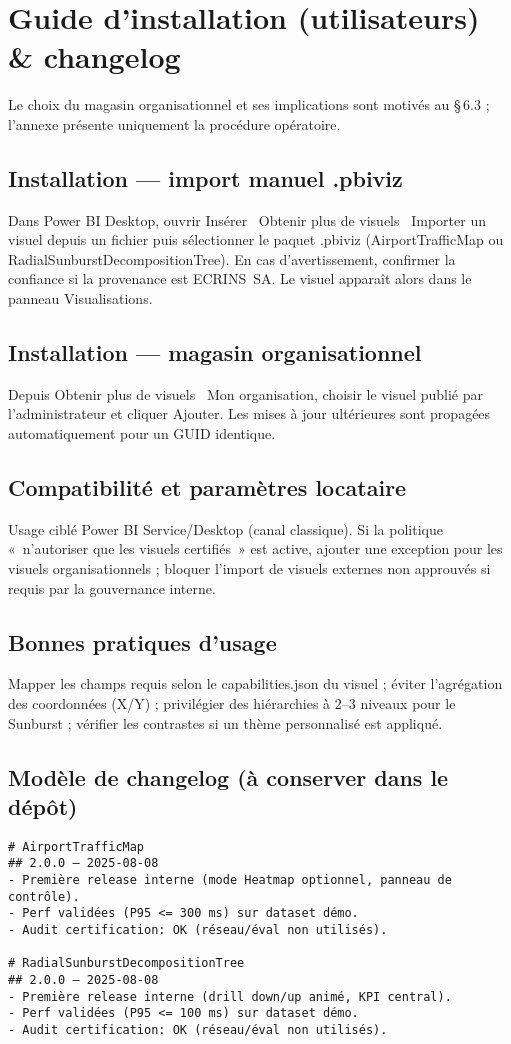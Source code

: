 \section{Guide d’installation (utilisateurs) \& changelog}
\label{ann:a6-install}
Le choix du magasin organisationnel et ses implications sont motivés au \S\,6.3 ; l’annexe présente uniquement la procédure opératoire.

\subsection{Installation — import manuel .pbiviz}
Dans Power BI Desktop, ouvrir Insérer \textrightarrow\ Obtenir plus de visuels \textrightarrow\ Importer un visuel depuis un fichier puis sélectionner le paquet .pbiviz (AirportTrafficMap ou RadialSunburstDecompositionTree). En cas d’avertissement, confirmer la confiance si la provenance est ECRINS~SA. Le visuel apparaît alors dans le panneau Visualisations.

\subsection{Installation — magasin organisationnel}
Depuis Obtenir plus de visuels \textrightarrow\ Mon organisation, choisir le visuel publié par l’administrateur et cliquer Ajouter. Les mises à jour ultérieures sont propagées automatiquement pour un GUID identique.

\subsection{Compatibilité et paramètres locataire}
Usage ciblé Power BI Service/Desktop (canal classique). Si la politique «~n’autoriser que les visuels certifiés~» est active, ajouter une exception pour les visuels organisationnels ; bloquer l’import de visuels externes non approuvés si requis par la gouvernance interne.

\subsection{Bonnes pratiques d’usage}
Mapper les champs requis selon le capabilities.json du visuel ; éviter l’agrégation des coordonnées (X/Y) ; privilégier des hiérarchies à 2--3 niveaux pour le Sunburst ; vérifier les contrastes si un thème personnalisé est appliqué.

\subsection{Modèle de changelog (à conserver dans le dépôt)}
\begin{verbatim}
# AirportTrafficMap
## 2.0.0 — 2025-08-08
- Première release interne (mode Heatmap optionnel, panneau de contrôle).
- Perf validées (P95 <= 300 ms) sur dataset démo.
- Audit certification: OK (réseau/éval non utilisés).

# RadialSunburstDecompositionTree
## 2.0.0 — 2025-08-08
- Première release interne (drill down/up animé, KPI central).
- Perf validées (P95 <= 100 ms) sur dataset démo.
- Audit certification: OK (réseau/éval non utilisés).
\end{verbatim}

